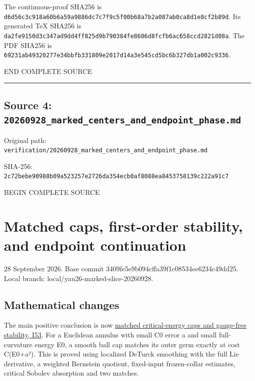 \documentclass[
  10pt,
]{article}
\begin{document}
The continuous-proof SHA256 is
\nolinkurl{d6d56c3c918a60b6a59a9886dc7c7f9c5f00b68a7b2a087ab0ca8d1e8cf2b89d}. Its
generated TeX SHA256 is
\nolinkurl{da2fe9150d3c347ad9dd4ff825d9b790384fe8606d8fcfb6ac658ccd2821d08a}. The
PDF SHA256 is
\nolinkurl{69231ab49320277e34bbfb331809e2017d14a3e545cd5bc6b327db1a002c9336}.

END COMPLETE SOURCE

\begin{center}\rule{0.5\linewidth}{0.5pt}\end{center}

\hypertarget{source-4-20260928_marked_centers_and_endpoint_phase.md}{%
\subsection{Source 4:
\nolinkurl{20260928_marked_centers_and_endpoint_phase.md}}\label{source-4-20260928_marked_centers_and_endpoint_phase.md}}

Original path:
\nolinkurl{verification/20260928_marked_centers_and_endpoint_phase.md}

SHA-256:
\nolinkurl{2c72bebe90988b09a523257e2726da354ecb0af8088ea8453758139c222a91c7}

BEGIN COMPLETE SOURCE

\hypertarget{matched-caps-first-order-stability-and-endpoint-continuation}{%
\section{Matched caps, first-order stability, and endpoint
continuation}\label{matched-caps-first-order-stability-and-endpoint-continuation}}

28 September 2026. Base commit 3409fe5e9b094cffa39f1c08534ee6234c49dd25.
Local branch: local/yau26-marked-slice-20260928.

\hypertarget{mathematical-changes-1}{%
\subsection{Mathematical changes}\label{mathematical-changes-1}}

The main positive conclusion is now
\href{../continuation/20260928_intrinsic_caps_and_stability.md}{matched
critical-energy caps and gauge-free stability, I53}. For a Euclidean
annulus with small C0 error a and small full-curvature energy E0, a
smooth ball cap matches its outer germ exactly at cost C(E0+a²). This is
proved using localized DeTurck smoothing with the full Lie derivative, a
weighted Bernstein quotient, fixed-input frozen-collar estimates,
critical Sobolev absorption and two matches.
\end{document}

